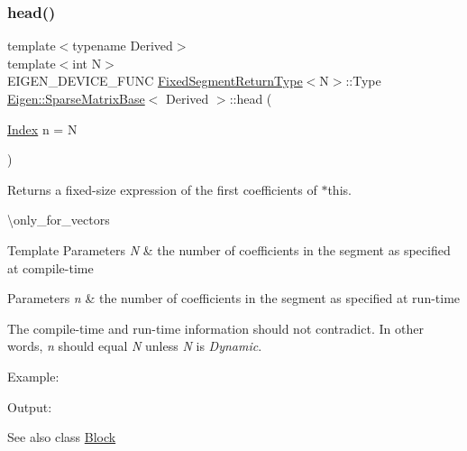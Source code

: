 \subsubsection{\texorpdfstring{head()}{head()}\hspace{0.1cm}{\footnotesize\ttfamily [2/2]}}
{\footnotesize\ttfamily template$<$typename Derived$>$ \\
template$<$int N$>$ \\
E\+I\+G\+E\+N\+\_\+\+D\+E\+V\+I\+C\+E\+\_\+\+F\+U\+NC \mbox{\hyperlink{struct_eigen_1_1_sparse_matrix_base_1_1_fixed_segment_return_type}{Fixed\+Segment\+Return\+Type}}$<$N$>$\+::Type \mbox{\hyperlink{class_eigen_1_1_sparse_matrix_base}{Eigen\+::\+Sparse\+Matrix\+Base}}$<$ Derived $>$\+::head (\begin{DoxyParamCaption}\item[{\mbox{\hyperlink{struct_eigen_1_1_eigen_base_a554f30542cc2316add4b1ea0a492ff02}{Index}}}]{n = {\ttfamily N} }\end{DoxyParamCaption})\hspace{0.3cm}{\ttfamily [inline]}}

\begin{DoxyReturn}{Returns}
a fixed-\/size expression of the first coefficients of $\ast$this.
\end{DoxyReturn}
\textbackslash{}only\+\_\+for\+\_\+vectors


\begin{DoxyTemplParams}{Template Parameters}
{\em N} & the number of coefficients in the segment as specified at compile-\/time \\
\hline
\end{DoxyTemplParams}

\begin{DoxyParams}{Parameters}
{\em n} & the number of coefficients in the segment as specified at run-\/time\\
\hline
\end{DoxyParams}
The compile-\/time and run-\/time information should not contradict. In other words, {\itshape n} should equal {\itshape N} unless {\itshape N} is {\itshape Dynamic}.

Example\+: 
\begin{DoxyCodeInclude}{0}
\end{DoxyCodeInclude}
 Output\+: 
\begin{DoxyVerbInclude}
\end{DoxyVerbInclude}


\begin{DoxySeeAlso}{See also}
class \mbox{\hyperlink{class_eigen_1_1_block}{Block}} 
\end{DoxySeeAlso}
\mbox{\label{class_eigen_1_1_sparse_matrix_base_a1843284eb1a87e8bd37791941a751b2b}} 
